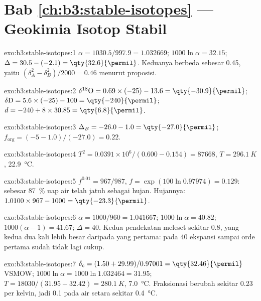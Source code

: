 \section*{Bab \ref{ch:b3:stable-isotopes} --- Geokimia Isotop Stabil}

\begin{solution}{exo:b3:stable-isotopes:1}
$\alpha = 1030.5/997.9 = 1.032669$; $1000\ln\alpha = 32.15$; $\Delta = 30.5 -
(-2.1) = \qty{32.6}{\permil}$. Keduanya berbeda sebesar \qty{0.45}{\permil}, yaitu
$(\delta_A^2 - \delta_B^2)/2000 = 0.46$ menurut proposisi.
\end{solution}

\begin{solution}{exo:b3:stable-isotopes:2}
$\delta^{18}\mathrm O = 0.69\times(-25) - 13.6 = \qty{-30.9}{\permil}$;
$\delta\mathrm D = 5.6\times(-25) - 100 = \qty{-240}{\permil}$; $d = -240 +
8\times30.85 = \qty{6.8}{\permil}$.
\end{solution}

\begin{solution}{exo:b3:stable-isotopes:3}
$\Delta_B = -26.0 - 1.0 = \qty{-27.0}{\permil}$; $f_{\mathrm{org}} = (-5 -
1.0)/(-27.0) = 0.22$.
\end{solution}

\begin{solution}{exo:b3:stable-isotopes:4}
$T^2 = 0.0391\times10^6/(0.600 - 0.154) = \num{87668}$, $T = \qty{296.1}{K}$,
\qty{22.9}{\celsius}.
\end{solution}

\begin{solution}{exo:b3:stable-isotopes:5}
$f^{0.01} = 967/987$, $f = \exp(100\ln0.97974) = 0.129$: sebesar \qty{87}{\percent} uap air
telah jatuh sebagai hujan. Hujannya: $1.0100\times967 - 1000 =
\qty{-23.3}{\permil}$.
\end{solution}

\begin{solution}{exo:b3:stable-isotopes:6}
$\alpha = 1000/960 = 1.041667$; $1000\ln\alpha = 40.82$; $1000(\alpha - 1) =
41.67$; $\Delta = 40$. Kedua pendekatan meleset sekitar \qty{0.8}{\permil}, yang kedua
dua kali lebih besar daripada yang pertama: pada \qty{40}{\permil} ekspansi
sampai orde pertama sudah tidak lagi cukup.
\end{solution}

\begin{solution}{exo:b3:stable-isotopes:7}
$\delta_c = (1.50 + 29.99)/0.97001 = \qty{32.46}{\permil}$ VSMOW; $1000\ln\alpha
= 1000\ln1.032464 = 31.95$; $T = 18030/(31.95 + 32.42) = \qty{280.1}{K}$,
\qty{7.0}{\celsius}. Fraksionasi berubah sekitar \qty{0.23}{\permil} per
kelvin, jadi \qty{0.1}{\permil} pada air setara sekitar \qty{0.4}{\celsius}.
\end{solution}

